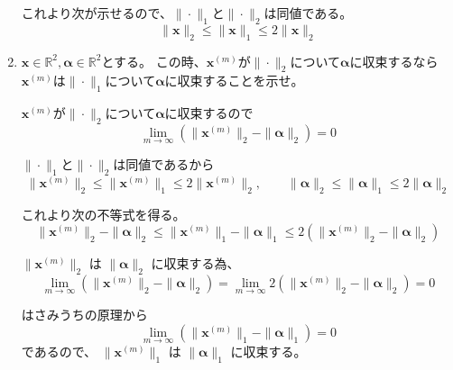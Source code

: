 \documentclass[10pt,b5paper]{ltjsarticle}
\begin{document}
\begin{enumerate}
      これより次が示せるので、$\|\cdot\|_1$と$\|\cdot\|_2$は同値である。
      \begin{equation}
       \| \bm{x} \|_2 \leq \| \bm{x}\|_1 \leq 2 \| \bm{x}\|_2
      \end{equation}

      \hrulefill
 \item
      $\bm{x}\in\mathbb{R}^2, \bm{\alpha}\in\mathbb{R}^2$とする。
      この時、$\bm{x}^{(m)}$が$\|\cdot\|_2$について$\bm{\alpha}$に収束するなら
      $\bm{x}^{(m)}$は$\|\cdot\|_1$について$\bm{\alpha}$に収束することを示せ。

      \dotfill

      $\bm{x}^{(m)}$が$\|\cdot\|_2$について$\bm{\alpha}$に収束するので
      \begin{equation}
       \lim_{m\rightarrow\infty}(\|\bm{x}^{(m)}\|_2 -\|\bm{\alpha}\|_2)=0
      \end{equation}

      $\|\cdot\|_1$と$\|\cdot\|_2$は同値であるから
      \begin{equation}
       \| \bm{x}^{(m)} \|_2 \leq \| \bm{x}^{(m)}\|_1 \leq 2 \| \bm{x}^{(m)}\|_2
        , \qquad
       \| \bm{\alpha} \|_2 \leq \| \bm{\alpha}\|_1 \leq 2 \| \bm{\alpha}\|_2
      \end{equation}

      これより次の不等式を得る。
      \begin{equation}
       \| \bm{x}^{(m)} \|_2 -\|\bm{\alpha}\|_2
        \leq \| \bm{x}^{(m)}\|_1 -\|\bm{\alpha}\|_1
        \leq 2 (\| \bm{x}^{(m)}\|_2-\|\bm{\alpha}\|_2)
      \end{equation}

      $\| \bm{x}^{(m)} \|_2$ は $\|\bm{\alpha}\|_2$ に収束する為、
      \begin{equation}
       \lim_{m\rightarrow\infty} ( \| \bm{x}^{(m)} \|_2 -\|\bm{\alpha}\|_2 )
        =
        \lim_{m\rightarrow\infty} 2 ( \| \bm{x}^{(m)} \|_2 -\|\bm{\alpha}\|_2 )
        =0
      \end{equation}

      はさみうちの原理から
      \begin{equation}
       \lim_{m\rightarrow\infty} ( \| \bm{x}^{(m)} \|_1 -\|\bm{\alpha}\|_1 ) =0
      \end{equation}
      であるので、
      $\| \bm{x}^{(m)} \|_1$ は $\|\bm{\alpha}\|_1$ に収束する。
\end{enumerate}

\end{document}
